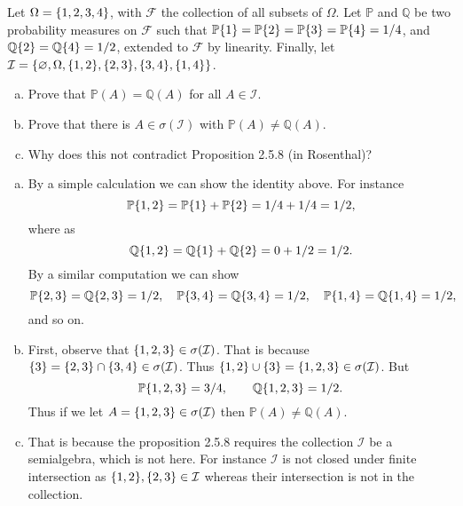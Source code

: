 \begin{problem}
	\label{prob:BeingSemiAlgebraIsImportant}
	Let $ \Omega = \{1,2,3,4\} $, with $ \mathcal{F} $ the collection of all subsets of $ \Omega $. Let $ \mathbb{P} $ and $\mathbb{Q}$ be two probability measures on $ \mathcal{F} $ such that $ \mathbb{P}\{1\} = \mathbb{P}\{2\} = \mathbb{P}\{3\} = \mathbb{P}\{4\} = 1/4 $, and $ \mathbb{Q}\{2\} = \mathbb{Q}\{4\} = 1/2 $, extended to $ \mathcal{F} $ by linearity. Finally, let $ \mathcal{I}=\{\varnothing,\Omega,\{1,2\},\{2,3\},\{3,4\},\{1,4\}\} $.
	\begin{enumerate}[(a)]
		\item Prove that $ \mathbb{P}(A) = \mathbb{Q}(A) $ for all $ A \in \mathcal{I} $.
		\item Prove that there is $ A \in \sigma(\mathcal{I}) $ with $ \mathbb{P}(A) \neq \mathbb{Q}(A) $.
		\item Why does this not contradict Proposition 2.5.8 (in Rosenthal)?
	\end{enumerate}
\end{problem}
\begin{solution}
	\begin{enumerate}[(a)]
		\item By a simple calculation we can show the identity above. For instance
		\[ \mathbb{P}\{1,2\} = \mathbb{P}\{1\} + \mathbb{P}\{2\} = 1/4 + 1/4 = 1/2, \]
		where as
		\[ \mathbb{Q}\{1,2\} = \mathbb{Q}\{1\} + \mathbb{Q}\{2\} = 0 + 1/2 = 1/2. \]
		By a similar computation we can show
		\[ \mathbb{P}\{2,3\}=\mathbb{Q}\{2,3\}=1/2,\quad \mathbb{P}\{3,4\}=\mathbb{Q}\{3,4\}=1/2, \quad \mathbb{P}\{1,4\}=\mathbb{Q}\{1,4\}=1/2, \]
		and so on.
		
		\item First, observe that $ \{1,2,3\} \in \sigma(\mathcal{I}) $. That is because $ \{3\} = \{2,3\}\cap \{3,4\} \in \sigma(\mathcal{I}) $. Thus $ \{1,2\}\cup\{3\} = \{1,2,3\} \in \sigma(\mathcal{I}) $. But
		\[ \mathbb{P}\{1,2,3\} = 3/4, \qquad \mathbb{Q}\{1,2,3\} = 1/2. \]
		Thus if we let $ A = \{1,2,3\} \in \sigma(\mathcal{I}) $ then $ \mathbb{P}(A) \neq \mathbb{Q}(A) $.
		
		\item That is because the proposition 2.5.8 requires the collection $ \mathcal{I} $ be a semialgebra, which is not here. For instance $ \mathcal{I} $ is not closed under finite intersection as $ \{1,2\},\{2,3\} \in\mathcal{I} $ whereas their intersection is not in the collection.
	\end{enumerate}
\end{solution}

